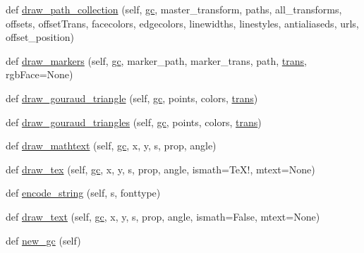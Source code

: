 \begin{DoxyCompactItemize}
\item 
def \hyperlink{classmatplotlib_1_1backends_1_1backend__pdf_1_1RendererPdf_a1698276fa3f816088f8bea79402e4cb0}{draw\+\_\+path\+\_\+collection} (self, \hyperlink{classmatplotlib_1_1backends_1_1backend__pdf_1_1RendererPdf_a2cd9993f14dab9c29af6085a273257c1}{gc}, master\+\_\+transform, paths, all\+\_\+transforms, offsets, offset\+Trans, facecolors, edgecolors, linewidths, linestyles, antialiaseds, urls, offset\+\_\+position)
\item 
def \hyperlink{classmatplotlib_1_1backends_1_1backend__pdf_1_1RendererPdf_adde15168742b737646c0c4bb63312e21}{draw\+\_\+markers} (self, \hyperlink{classmatplotlib_1_1backends_1_1backend__pdf_1_1RendererPdf_a2cd9993f14dab9c29af6085a273257c1}{gc}, marker\+\_\+path, marker\+\_\+trans, path, \hyperlink{size_2foo_8f90_afabfd8da71309850231a00e53c61f106}{trans}, rgb\+Face=None)
\item 
def \hyperlink{classmatplotlib_1_1backends_1_1backend__pdf_1_1RendererPdf_a89ce178a9ec2648948712b6d60b13979}{draw\+\_\+gouraud\+\_\+triangle} (self, \hyperlink{classmatplotlib_1_1backends_1_1backend__pdf_1_1RendererPdf_a2cd9993f14dab9c29af6085a273257c1}{gc}, points, colors, \hyperlink{size_2foo_8f90_afabfd8da71309850231a00e53c61f106}{trans})
\item 
def \hyperlink{classmatplotlib_1_1backends_1_1backend__pdf_1_1RendererPdf_a1e7ae613854b1d20a499fba8b5fff9db}{draw\+\_\+gouraud\+\_\+triangles} (self, \hyperlink{classmatplotlib_1_1backends_1_1backend__pdf_1_1RendererPdf_a2cd9993f14dab9c29af6085a273257c1}{gc}, points, colors, \hyperlink{size_2foo_8f90_afabfd8da71309850231a00e53c61f106}{trans})
\item 
def \hyperlink{classmatplotlib_1_1backends_1_1backend__pdf_1_1RendererPdf_ac9cd1bfbbeff85fe0adbbb257ed532db}{draw\+\_\+mathtext} (self, \hyperlink{classmatplotlib_1_1backends_1_1backend__pdf_1_1RendererPdf_a2cd9993f14dab9c29af6085a273257c1}{gc}, x, y, s, prop, angle)
\item 
def \hyperlink{classmatplotlib_1_1backends_1_1backend__pdf_1_1RendererPdf_aed4f16e490c665d04c821a5ffcd31939}{draw\+\_\+tex} (self, \hyperlink{classmatplotlib_1_1backends_1_1backend__pdf_1_1RendererPdf_a2cd9993f14dab9c29af6085a273257c1}{gc}, x, y, s, prop, angle, ismath=\textquotesingle{}Te\+X!\textquotesingle{}, mtext=None)
\item 
def \hyperlink{classmatplotlib_1_1backends_1_1backend__pdf_1_1RendererPdf_ac7ad0af5ea21fe740bec658dca3ff560}{encode\+\_\+string} (self, s, fonttype)
\item 
def \hyperlink{classmatplotlib_1_1backends_1_1backend__pdf_1_1RendererPdf_a8d026674d3590aa13d2df430e71d7297}{draw\+\_\+text} (self, \hyperlink{classmatplotlib_1_1backends_1_1backend__pdf_1_1RendererPdf_a2cd9993f14dab9c29af6085a273257c1}{gc}, x, y, s, prop, angle, ismath=False, mtext=None)
\item 
def \hyperlink{classmatplotlib_1_1backends_1_1backend__pdf_1_1RendererPdf_a99fdbc6cc265d2b082d15b86c6ca4bbf}{new\+\_\+gc} (self)
\end{DoxyCompactItemize}
